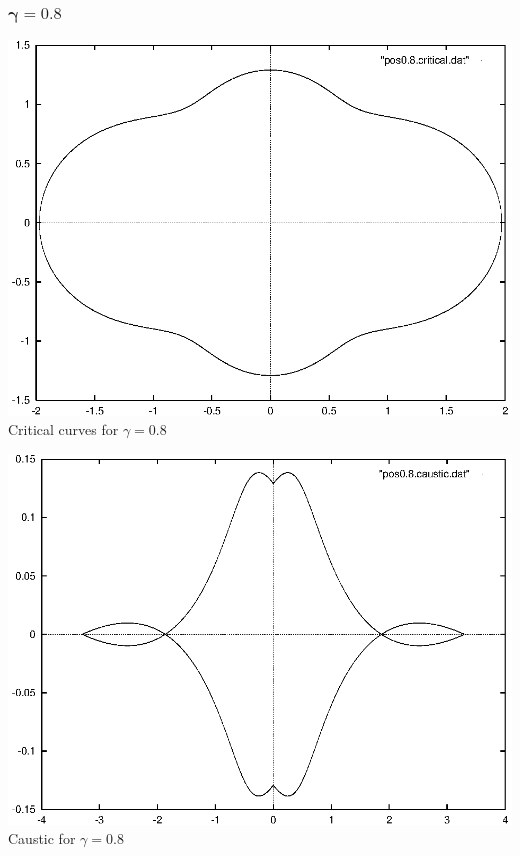 \documentclass[a4paper]{IEEEtran}
\begin{document}
    \subsubsection{$\mathbf{\gamma = 0.8}$}
    \begin{center}
        \includegraphics{images/pos0-8-critical.eps} 
        \\[1mm]
        Critical curves for $\gamma = 0.8$
    \end{center}
    \begin{center}
        \includegraphics{images/pos0-8-caustic.eps} 
        \\[1mm]
        Caustic for $\gamma = 0.8$
    \end{center}
\end{document}
